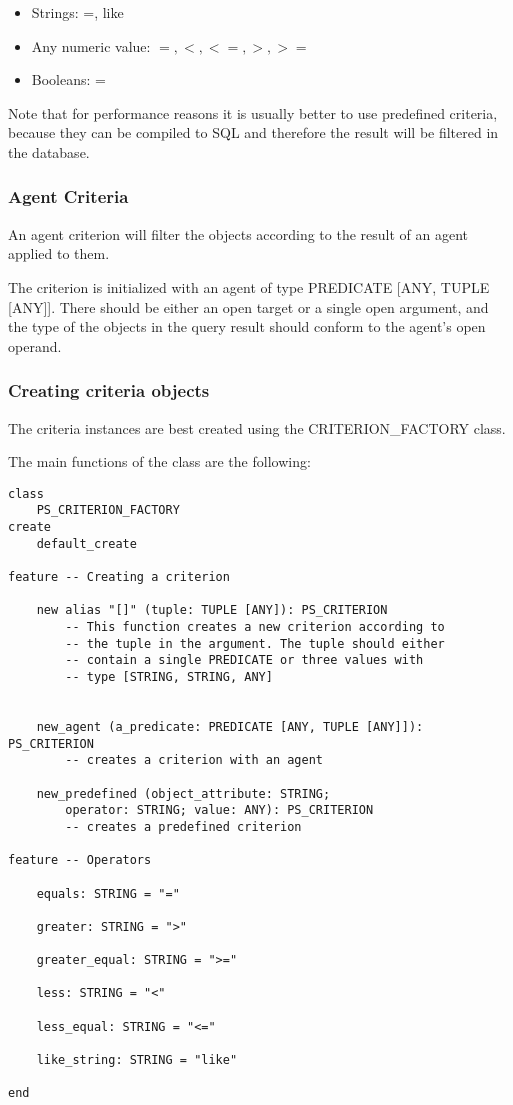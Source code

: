  \begin{itemize}
  \item Strings: =, like
  \item Any numeric value: $=, <, <=, >, >=$
  \item Booleans: =
 \end{itemize}

Note that for performance reasons it is usually better to use predefined criteria, because they can be compiled to SQL and therefore the result will be filtered in the database.

\subsubsection{Agent Criteria}

An agent criterion will filter the objects according to the result of an agent applied to them.

The criterion is initialized with an agent of type PREDICATE [ANY, TUPLE [ANY]]. 
There should be either an open target or a single open argument, and the type of the objects in the query result should conform to the agent's open operand.


\subsubsection{Creating criteria objects}

The criteria instances are best created using the CRITERION\_FACTORY class.

The main functions of the class are the following: 

\begin{lstlisting}[language=OOSC2Eiffel, captionpos=b, caption={The CRITERION\_FACTORY interface}, label={lst:factory_interface}]
class
	PS_CRITERION_FACTORY
create
	default_create

feature -- Creating a criterion

	new alias "[]" (tuple: TUPLE [ANY]): PS_CRITERION
		-- This function creates a new criterion according to 
		-- the tuple in the argument. The tuple should either 
		-- contain a single PREDICATE or three values with 
		-- type [STRING, STRING, ANY]


	new_agent (a_predicate: PREDICATE [ANY, TUPLE [ANY]]): PS_CRITERION
		-- creates a criterion with an agent

	new_predefined (object_attribute: STRING; 
		operator: STRING; value: ANY): PS_CRITERION
		-- creates a predefined criterion

feature -- Operators

	equals: STRING = "="

	greater: STRING = ">"

	greater_equal: STRING = ">="

	less: STRING = "<"

	less_equal: STRING = "<="

	like_string: STRING = "like"

end
\end{lstlisting}

